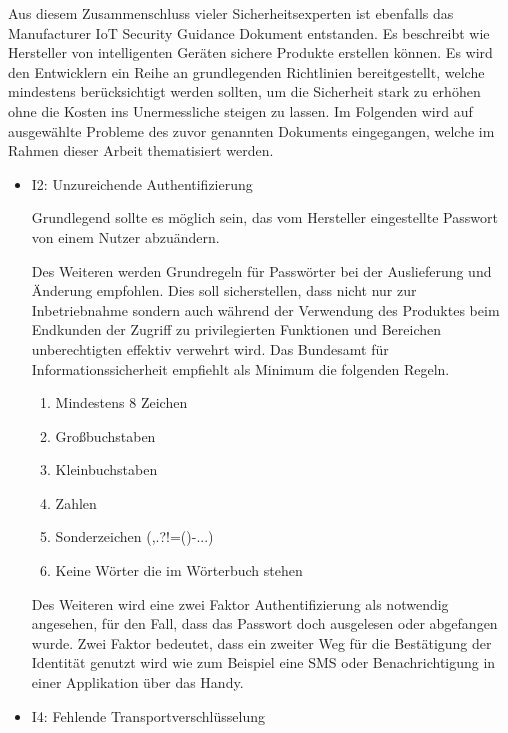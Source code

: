     Aus diesem Zusammenschluss vieler Sicherheitsexperten ist ebenfalls das Manufacturer \ac{IoT} Security Guidance Dokument entstanden. Es beschreibt wie Hersteller von intelligenten Geräten sichere Produkte erstellen können. Es wird den Entwicklern ein Reihe an grundlegenden Richtlinien bereitgestellt, welche mindestens berücksichtigt werden sollten, um die Sicherheit stark zu erhöhen ohne die Kosten ins Unermessliche steigen zu lassen. %
    Im Folgenden wird auf ausgewählte Probleme des zuvor genannten Dokuments eingegangen, welche im Rahmen dieser Arbeit thematisiert werden.
    \begin{itemize}
        \item I2:  Unzureichende Authentifizierung
        
        Grundlegend sollte es möglich sein, das vom Hersteller eingestellte Passwort von einem Nutzer abzuändern.
        
        Des Weiteren werden Grundregeln für Passwörter bei der Auslieferung und Änderung empfohlen. Dies soll sicherstellen, dass nicht nur zur Inbetriebnahme sondern auch während der Verwendung des Produktes beim Endkunden der Zugriff zu privilegierten Funktionen und Bereichen unberechtigten effektiv verwehrt wird. Das Bundesamt für Informationssicherheit %
        empfiehlt als Minimum die folgenden Regeln.
        \begin{enumerate}
            \item Mindestens 8 Zeichen
            \item Großbuchstaben
            \item Kleinbuchstaben
            \item Zahlen
            \item Sonderzeichen (,.?!=()-...)
            \item Keine Wörter die im Wörterbuch stehen
        \end{enumerate}
        
        Des Weiteren wird eine zwei Faktor Authentifizierung als notwendig angesehen, für den Fall, dass das Passwort doch ausgelesen oder abgefangen wurde. Zwei Faktor bedeutet, dass ein zweiter Weg für die Bestätigung der Identität genutzt wird wie zum Beispiel eine SMS oder Benachrichtigung in einer Applikation über das Handy.
        
        \item I4: Fehlende Transportverschlüsselung
        

\end{itemize}
